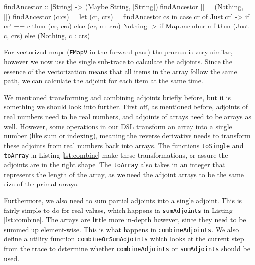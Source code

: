 \begin{haskell}
                    findAncestor :: [String] -> (Maybe String, [String])
                    findAncestor []     = (Nothing, [])
                    findAncestor (c:cs) =
                        let (cr, crs) = findAncestor cs
                        in  case cr of
                            Just cr' -> if cr' == c then (cr, crs) else (cr, c : crs)
                            Nothing  ->
                                if   Map.member c f 
                                then (Just c, crs)
                                else (Nothing, c : crs)
        \end{haskell}

        For vectorized maps (\texttt{FMapV} in the forward pass) the process is very similar, however we now use the single sub-trace to calculate the adjoints.
        Since the essence of the vectorization means that all items in the array follow the same path, we can calculate the adjoint for each item at the same time.

        We mentioned transforming and combining adjoints briefly before, but it is something we should look into further.
        First off, as mentioned before, adjoints of real numbers need to be real numbers, and adjoints of arrays need to be arrays as well.
        However, some operations in our DSL transform an array into a single number (like sum or indexing), meaning the reverse derivative needs to transform these adjoints from real numbers back into arrays.
        The functions \texttt{toSingle} and \texttt{toArray} in Listing \ref{lst:combine} make these transformations, or assure the adjoints are in the right shape.
        The \texttt{toArray} also takes in an integer that represents the length of the array, as we need the adjoint arrays to be the same size of the primal arrays.

        Furthermore, we also need to sum partial adjoints into a single adjoint.
        This is fairly simple to do for real values, which happens in \texttt{sumAdjoints} in Listing \ref{lst:combine}.
        The arrays are little more in-depth however, since they need to be summed up element-wise.
        This is what happens in \texttt{combineAdjoints}.
        We also define a utility function \texttt{combineOrSumAdjoints} which looks at the current step from the trace to determine whether \texttt{combineAdjoints} or \texttt{sumAdjoints} should be used.
        
